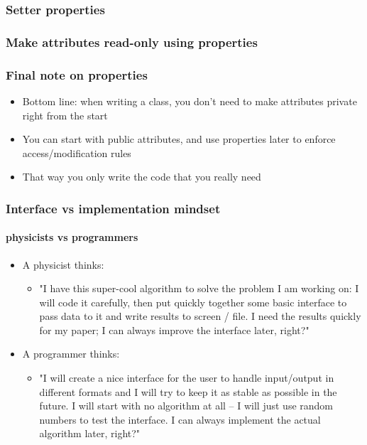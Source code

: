 \documentclass[9pt]{beamer}
\begin{document}
\begin{frame}
  \frametitle{Setter properties}
  
\end{frame}

\begin{frame}
  \frametitle{Make attributes read-only using properties}
  
\end{frame}

\begin{frame}
\frametitle{Final note on properties}
  \begin{itemize}
    \item Bottom line: when writing a class, you don't need to make attributes
          private right from the start
    \medskip
    \item You can start with public attributes, and use properties later to
          enforce access/modification rules
    \medskip
    \item That way you only write the code that you really need
  \end{itemize}
\end{frame}

\begin{frame}
  \frametitle{Interface vs implementation mindset}
  \framesubtitle{physicists vs programmers}

  \begin{itemize}

    \item A physicist thinks:

    \medskip

    \begin{itemize}
      \item "I have this super-cool algorithm to solve the problem I am working on:
             I will code it carefully, then put quickly together some basic
             interface to pass data to it and write results to screen / file.
             I need the results quickly for my paper; I can always improve the
             interface later, right?"
    \end{itemize}
    \medskip

    \item A programmer thinks:

    \medskip

    \begin{itemize}
      \item "I will create a nice interface for the user to handle input/output
             in different formats and I will try to keep it as stable as
             possible in the future.
             I will start with no algorithm at all -- I will just use random
             numbers to test the interface. I can always implement the
             actual algorithm later, right?"
    \end{itemize}

  \end{itemize}

\end{frame}
\end{document}

